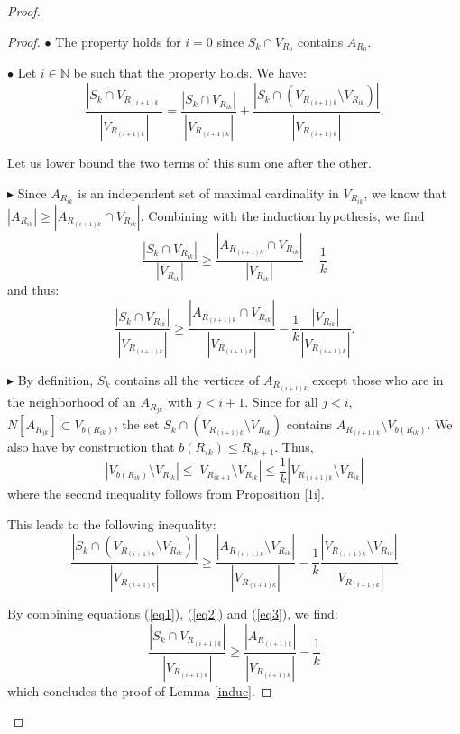 \documentclass{amsart}                     %
\begin{document}
\begin{proof}
\begin{proof}
 $\bullet$ The property holds for $i=0$ since $S_k\cap V_{R_0}$ contains $A_{R_0}$.
 
 $\bullet$ Let $i\in\mathbb N$ be such that the property holds. We have:
\begin{equation}\label{eq1}
\frac{|S_k\cap V_{R_{(i+1)k}}|}{|V_{R_{(i+1)k}}|}=\frac{|S_k\cap V_{R_{ik}}|}{|V_{R_{(i+1)k}}|}+\frac{|S_k\cap (V_{R_{(i+1)k}}\setminus V_{R_{ik}})|}{|V_{R_{(i+1)k}}|}.
\end{equation}

Let us lower bound the two terms of this sum one after the other.

$\blacktriangleright$ Since $A_{R_{ik}}$ is an independent set of maximal cardinality in $V_{R_{ik}}$, we know that  
$|A_{R_{ik}}|\geq |A_{R_{(i+1)k}}\cap V_{R_{ik}}|$. Combining with the induction hypothesis, we find
\[\frac{|S_k\cap V_{R_{ik}}|}{|V_{R_{ik}}|}\geq\frac{|A_{R_{(i+1)k}}\cap V_{R_{ik}}|}{|V_{R_{ik}}|}-\frac 1 k\]
and thus:
\begin{equation}\label{eq2}\frac{|S_k\cap V_{R_{ik}}|}{|V_{R_{(i+1)k}}|}\geq\frac{|A_{R_{(i+1)k}}\cap V_{R_{ik}}|}{|V_{R_{(i+1)k}}|}-\frac 1 k \frac {|V_{R_{ik}}|} {|V_{R_{(i+1)k}}|}.\end{equation}


$\blacktriangleright$ By definition, $S_k$ contains all the vertices of $A_{R_{(i+1)k}}$ except those who are in the neighborhood of an $A_{R_{jk}}$ with $j<i+1$. Since for all $j<i$, $N[A_{R_{jk}}]\subset V_{b(R_{ik})}$, the set 
$S_k\cap (V_{R_{(i+1)k}}\setminus V_{R_{ik}})$ contains  $A_{R_{(i+1)k}}\setminus V_{b(R_{ik})}$.
We also have by construction that $b(R_{ik})\leq R_{ik+1}$. 
Thus, \[|V_{b(R_{ik})}\setminus V_{R_{ik}}|\leq |V_{R_{ik+1}}\setminus V_{R_{ik}}|\leq \frac 1 k |V_{R_{(i+1)k}}\setminus V_{R_{ik}}|\]
where the second inequality follows from Proposition \ref{1i}.

This leads to the following inequality:
\begin{equation}\label{eq3}\frac{|S_k\cap (V_{R_{(i+1)k}}\setminus V_{R_{ik}})|}{|V_{R_{(i+1)k}}|}\geq \frac{|A_{R_{(i+1)k}}\setminus V_{R_{ik}}|}{|V_{R_{(i+1)k}}|}-\frac 1 k \frac{|V_{R_{(i+1)k}}\setminus V_{R_{ik}}|}{|V_{R_{(i+1)k}}|}\end{equation}

By combining equations (\ref{eq1}), (\ref{eq2}) and (\ref{eq3}), we find:
\[\frac{|S_k\cap V_{R_{(i+1)k}}|}{|V_{R_{(i+1)k}}|}\geq \frac{|A_{R_{(i+1)k}}|}{|V_{R_{(i+1)k}}|}-\frac 1 k\]
which concludes the proof of  Lemma \ref{induc}.
\end{proof}


\end{proof}
\end{document}
